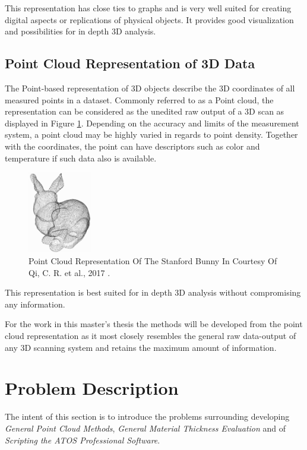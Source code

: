 \documentclass[%
]{USN-MSc}
\begin{document}
This representation has close ties to graphs and is very well suited for creating digital aspects or replications of physical objects. It provides good visualization and possibilities for in depth 3D analysis.

\subsection{Point Cloud Representation of 3D Data}
\label{ssc:point clouds}
The Point-based representation of 3D objects describe the 3D coordinates of all measured points in a dataset. Commonly referred to as a Point cloud, the representation can be considered as the unedited raw output of a 3D scan as displayed in Figure \ref{fig:Stanford Bunny Point Cloud}. Depending on the accuracy and limits of the measurement system, a point cloud may be highly varied in regards to point density. Together with the coordinates, the point can have descriptors such as color and temperature if such data also is available. 

\begin{figure}[H]
    \centering
    \includegraphics[width=0.25\textwidth]{fig/Stanford Bunny Point Cloud.png}
    \caption{Point Cloud Representation Of The Stanford Bunny \cite{Stanford-bunny} In Courtesy Of Qi, C. R. et al., 2017  \cite{Point-net-presentation}.}
    \label{fig:Stanford Bunny Point Cloud}
\end{figure}


This representation is best suited for in depth 3D analysis without compromising any information.

For the work in this master's thesis the methods will be developed from the point cloud representation as it most closely resembles the general raw data-output of any 3D scanning system and retains the maximum amount of information.

\section{Problem Description}
\label{sc:Problem Description}
The intent of this section is to introduce the problems surrounding developing \textit{General Point Cloud Methods}, \textit{General Material Thickness Evaluation} and of \textit{Scripting the ATOS Professional Software}.
\end{document}
